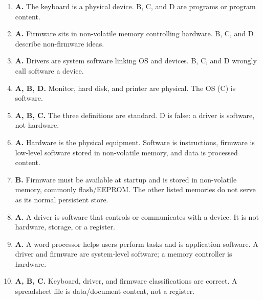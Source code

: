 \begin{enumerate}[label=\textbf{Q\arabic*.}, leftmargin=*]
\item \textbf{A.} The keyboard is a physical device. B, C, and D are programs or program content.
\item \textbf{A.} Firmware sits in non-volatile memory controlling hardware. B, C, and D describe non-firmware ideas.
\item \textbf{A.} Drivers are system software linking OS and devices. B, C, and D wrongly call software a device.
\item \textbf{A, B, D.} Monitor, hard disk, and printer are physical. The OS (C) is software.
\item \textbf{A, B, C.} The three definitions are standard. D is false: a driver is software, not hardware.
\item \textbf{A.} Hardware is the physical equipment. Software is instructions, firmware is low-level software stored in non-volatile memory, and data is processed content.

\item \textbf{B.} Firmware must be available at startup and is stored in non-volatile memory, commonly flash/EEPROM. The other listed memories do not serve as its normal persistent store.

\item \textbf{A.} A driver is software that controls or communicates with a device. It is not hardware, storage, or a register.

\item \textbf{A.} A word processor helps users perform tasks and is application software. A driver and firmware are system-level software; a memory controller is hardware.

\item \textbf{A, B, C.} Keyboard, driver, and firmware classifications are correct. A spreadsheet file is data/document content, not a register.

\end{enumerate}
